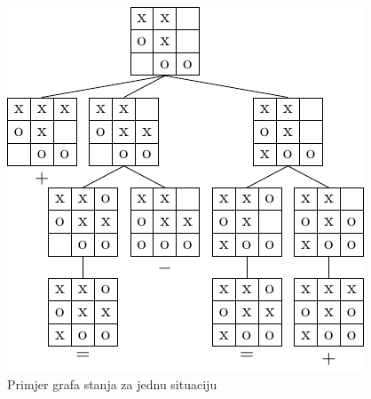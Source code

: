 \documentclass[times, utf8, seminar, numeric, tikz]{fer}
\begin{document}
\begin{figure}[h]
	\centering
	\includegraphics[width=0.7\linewidth]{Samples/tttExample.pdf}
	\caption{Primjer grafa stanja za jednu situaciju}
	\label{fig:minMaxExample}
\end{figure}  
\end{document}
